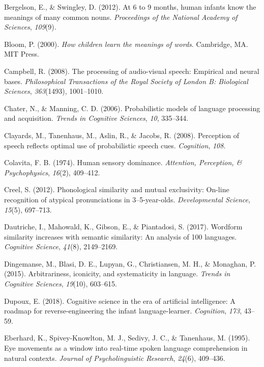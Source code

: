 \documentclass[english,,man,floatsintext]{apa6}
\theoremstyle{definition}
\theoremstyle{definition}
\theoremstyle{definition}
\theoremstyle{remark}
\begin{document}
\hypertarget{ref-bergelson2012}{}
Bergelson, E., \& Swingley, D. (2012). At 6 to 9 months, human infants
know the meanings of many common nouns. \emph{Proceedings of the
National Academy of Sciences}, \emph{109}(9).

\hypertarget{ref-bloom2000}{}
Bloom, P. (2000). \emph{How children learn the meanings of words}.
Cambridge, MA. MIT Press.

\hypertarget{ref-Campbell2008}{}
Campbell, R. (2008). The processing of audio-visual speech: Empirical
and neural bases. \emph{Philosophical Transactions of the Royal Society
of London B: Biological Sciences}, \emph{363}(1493), 1001--1010.

\hypertarget{ref-chater06}{}
Chater, N., \& Manning, C. D. (2006). Probabilistic models of language
processing and acquisition. \emph{Trends in Cognitive Sciences},
\emph{10}, 335--344.

\hypertarget{ref-clayard08}{}
Clayards, M., Tanenhaus, M., Aslin, R., \& Jacobs, R. (2008). Perception
of speech reflects optimal use of probabilistic speech cues.
\emph{Cognition}, \emph{108}.

\hypertarget{ref-colavita1974}{}
Colavita, F. B. (1974). Human sensory dominance. \emph{Attention,
Perception, \& Psychophysics}, \emph{16}(2), 409--412.

\hypertarget{ref-Creel2012}{}
Creel, S. (2012). Phonological similarity and mutual exclusivity:
On-line recognition of atypical pronunciations in 3--5-year-olds.
\emph{Developmental Science}, \emph{15}(5), 697--713.

\hypertarget{ref-dautriche17}{}
Dautriche, I., Mahowald, K., Gibson, E., \& Piantadosi, S. (2017).
Wordform similarity increases with semantic similarity: An analysis of
100 languages. \emph{Cognitive Science}, \emph{41}(8), 2149--2169.

\hypertarget{ref-dingemanse2015}{}
Dingemanse, M., Blasi, D. E., Lupyan, G., Christiansen, M. H., \&
Monaghan, P. (2015). Arbitrariness, iconicity, and systematicity in
language. \emph{Trends in Cognitive Sciences}, \emph{19}(10), 603--615.

\hypertarget{ref-dupoux2018}{}
Dupoux, E. (2018). Cognitive science in the era of artificial
intelligence: A roadmap for reverse-engineering the infant
language-learner. \emph{Cognition}, \emph{173}, 43--59.

\hypertarget{ref-Eberhard1995}{}
Eberhard, K., Spivey-Knowlton, M. J., Sedivy, J. C., \& Tanenhaus, M.
(1995). Eye movements as a window into real-time spoken language
comprehension in natural contexts. \emph{Journal of Psycholinguistic
Research}, \emph{24}(6), 409--436.
\end{document}
